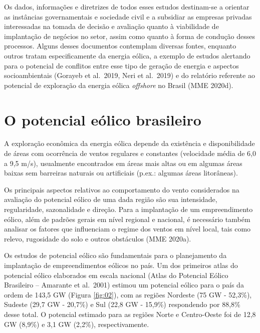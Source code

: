 \documentclass[
  oneside]{scrbook}
\begin{document}
Os dados, informações e diretrizes de todos esses estudos destinam-se a orientar as instâncias governamentais e sociedade civil e a subsidiar as empresas privadas interessadas na tomada de decisão e avaliação quanto à viabilidade de implantação de negócios no setor, assim como quanto à forma de condução desses processos. Alguns desses documentos contemplam diversas fontes, enquanto outros tratam especificamente da energia eólica, a exemplo de estudos alertando para o potencial de conflitos entre esse tipo de geração de energia e aspectos socioambientais (Gorayeb et al.~2019, Neri et al.~2019) e do relatório referente ao potencial de exploração da energia eólica \emph{offshore} no Brasil (MME 2020d).

\hypertarget{o-potencial-euxf3lico-brasileiro}{%
\section{O potencial eólico brasileiro}\label{o-potencial-euxf3lico-brasileiro}}

A exploração econômica da energia eólica depende da existência e disponibilidade de áreas com ocorrência de ventos regulares e constantes (velocidade média de 6,0 a 9,5 m/s), usualmente encontrados em áreas mais altas ou em algumas áreas baixas sem barreiras naturais ou artificiais (p.ex.: algumas áreas litorâneas).

Os principais aspectos relativos ao comportamento do vento considerados na avaliação do potencial eólico de uma dada região são sua intensidade, regularidade, sazonalidade e direção. Para a implantação de um empreendimento eólico, além de padrões gerais em nível regional e nacional, é necessário também analisar os fatores que influenciam o regime dos ventos em nível local, tais como relevo, rugosidade do solo e outros obstáculos (MME 2020a).

Os estudos de potencial eólico são fundamentais para o planejamento da implantação de empreendimentos eólicos no país. Um dos primeiros atlas do potencial eólico elaborados em escala nacional (Atlas do Potencial Eólico Brasileiro -- Amarante et al.~2001) estimou um potencial eólico para o país da ordem de 143,5 GW (Figura \ref{fig:02}), com as regiões Nordeste (75 GW - 52,3\%), Sudeste (29,7 GW - 20,7\%) e Sul (22,8 GW - 15,9\%) respondendo por 88,8\% desse total. O potencial estimado para as regiões Norte e Centro-Oeste foi de 12,8 GW (8,9\%) e 3,1 GW (2,2\%), respectivamente.
\end{document}
